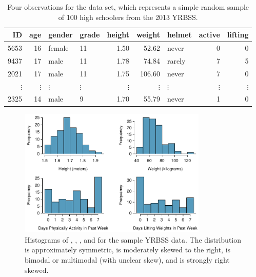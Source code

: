 \begin{table}
\centering
\begin{tabular}{rrllrrlrr}
  \hline
ID & age & gender & grade & height & weight & helmet & active & lifting \\ 
  \hline
5653 &  16 & female & 11 & 1.50 & 52.62 & never &   0 &   0 \\ 
  9437 &  17 & male & 11 & 1.78 & 74.84 & rarely &   7 &   5 \\ 
  2021 &  17 & male & 11 & 1.75 & 106.60 & never &   7 &   0 \\ 
  $\vdots$ & $\vdots$ & $\vdots$ & $\vdots$ & $\vdots$ & $\vdots$ & $\vdots$ & $\vdots$ & $\vdots$ \\
  2325 &  14 & male & 9 & 1.70 & 55.79 & never &   1 &   0 \\ 
   \hline
\end{tabular}
\caption{Four observations for the  data set, which represents a simple random sample of 100 high schoolers from the 2013 YRBSS.}
\label{yrbssSampDF}
\end{table}



\begin{figure}
\centering
\includegraphics[width=0.8\textwidth]{ch_inference_foundations/figures/yrbssSampHistograms/yrbssSampHistograms} 
\caption{Histograms of , , , and  for the sample YRBSS data. The  distribution is approximately symmetric,  is moderately skewed to the right,  is bimodal or multimodal (with unclear skew), and  is strongly right skewed.}
\label{yrbssSampHistograms}
\end{figure}


